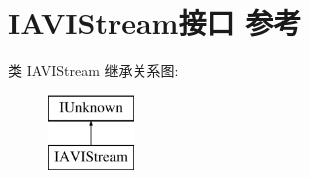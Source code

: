 \hypertarget{interface_i_a_v_i_stream}{}\section{I\+A\+V\+I\+Stream接口 参考}
\label{interface_i_a_v_i_stream}
类 I\+A\+V\+I\+Stream 继承关系图\+:\begin{figure}[H]
\begin{center}
\leavevmode
\includegraphics[height=2.000000cm]{interface_i_a_v_i_stream}
\end{center}
\end{figure}
